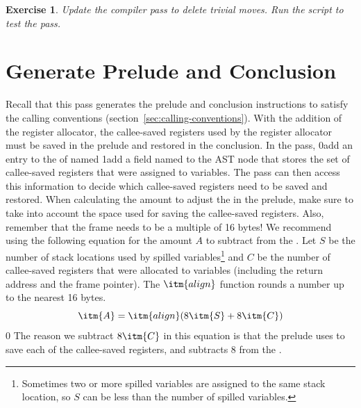 \documentclass[7x10]{TimesAPriori_MIT}%
\def\racketEd{0}
\def\pythonEd{1}
\def\edition{1}
\def\xeightysixEd{0}
\def\architecture{1}
\newcommand{\racket}[1]{{\if\edition\racketEd{#1}\fi}}
\newcommand{\pythonColor}[0]{}
\newcommand{\python}[1]{{\if\edition\pythonEd\pythonColor #1\fi}}
\newtheorem{exercise}[theorem]{Exercise}
\numberwithin{theorem}{chapter}
\numberwithin{definition}{chapter}
\numberwithin{equation}{chapter}
\begin{document}
\begin{exercise}\normalfont\normalsize
%
Update the  compiler pass to delete trivial moves.
%
%
Run the script to test the  pass.
\end{exercise}


\section{Generate Prelude and Conclusion}
\label{sec:print-x86-reg-alloc}

Recall that this pass generates the prelude and conclusion
instructions to satisfy the {\ArchName} calling conventions
(section~\ref{sec:calling-conventions}). With the addition of the
register allocator, the callee-saved registers used by the register
allocator must be saved in the prelude and restored in the conclusion.
In the  pass,
%
\racket{add an entry to the 
  of  named }
%
\python{add a field named \code{used\_callee} to the \code{{\ARCHNAME}Program} AST node}
%
that stores the set of callee-saved registers that were assigned to
variables. The  pass can then access
this information to decide which callee-saved registers need to be
saved and restored.
%
When calculating the amount to adjust the \SP{} in the prelude,
make sure to take into account the space used for saving the
callee-saved registers. Also, remember that the frame needs to be a
multiple of 16 bytes! We recommend using the following equation for
the amount $A$ to subtract from the \SP. Let $S$ be the number
of stack locations used by spilled variables\footnote{Sometimes two or
  more spilled variables are assigned to the same stack location, so
  $S$ can be less than the number of spilled variables.} and $C$ be
the number of callee-saved registers that were
allocated to
variables (including the return address and the frame pointer). The
$\itm{align}$ function rounds a number up to the nearest 16 bytes.
\[
  \itm{A} = \itm{align}(8\itm{S} + 8\itm{C})
\if\architecture\xeightysixEd
- 8\itm{C}
\fi
\]
\if\architecture\xeightysixEd
The reason we subtract $8\itm{C}$ in this equation is that the
prelude uses  to save each of the callee-saved registers,
and  subtracts $8$ from the .
\fi
\end{document}
